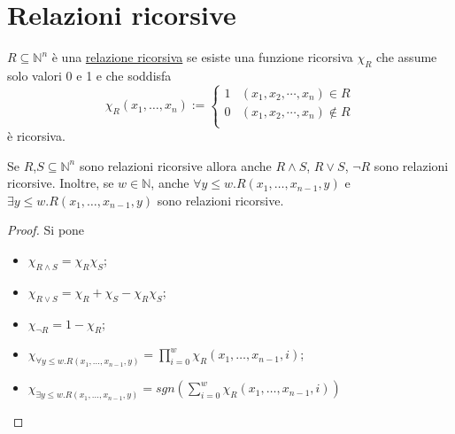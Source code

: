 \section{Relazioni ricorsive}
\begin{definizione} $R \subseteq \mathbb{N}^{n}$ \`e una \underline{relazione
ricorsiva} se esiste una funzione ricorsiva $\chi_R$ che assume solo valori 0 e
1 e che soddisfa
$$\chi_R(x_1, \ldots, x_n):= \left \{ \begin{array}{ll}
                                      1 & (x_{1}, x_{2}, \cdots, x_{n}) \in R\\
                                      0 & (x_{1}, x_{2}, \cdots, x_{n}) \not \in
 R\\
                                      \end{array} \right. $$
\`e ricorsiva.
\end{definizione}
\begin{proposizione} Se $R$,$S \subseteq \mathbb{N}^{n}$ sono relazioni
ricorsive allora anche $R\land S$, $R \vee S$,
$\neg R$ sono relazioni ricorsive. Inoltre, se $w \in \mathbb{N}$, anche
$\forall y
\leq w. R(x_1, \ldots, x_{n-1}, y)$ e $\exists y
\leq w. R(x_1, \ldots, x_{n-1}, y)$ sono relazioni ricorsive.
\end{proposizione}
\begin{proof} Si pone
\begin{itemize}
\item $\chi_{R\land S} = \chi_R \chi_S$;
\item $\chi_{R\vee S} = \chi_R + \chi_S - \chi_R  \chi_S$;
\item $\chi_{\neg R} = 1 - \chi_R$;
\item $\chi_{\forall y
\leq w. R(x_1, \ldots, x_{n-1}, y)} = \prod_{i=0}^{w} \chi_R(x_1, \ldots,
x_{n-1},i)$;
\item $\chi_{\exists y
\leq w. R(x_1, \ldots, x_{n-1}, y)} = sgn(\sum_{i=0}^{w} \chi_R(x_1, \ldots,
x_{n-1},i))$
\end{itemize}
\end{proof}

